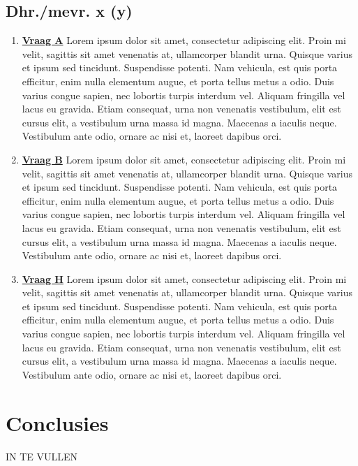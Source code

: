 \documentclass{hogent-article}
\begin{document}
\subsection{Dhr./mevr. x (y)}

\vspace{5pt}

\begin{enumerate}
    \item \textbf{\underline{Vraag A}}\vspace{5pt}\newline
    Lorem ipsum dolor sit amet, consectetur adipiscing elit. Proin mi velit, sagittis sit amet venenatis at, ullamcorper blandit urna. Quisque varius et ipsum sed tincidunt. Suspendisse potenti. Nam vehicula, est quis porta efficitur, enim nulla elementum augue, et porta tellus metus a odio. Duis varius congue sapien, nec lobortis turpis interdum vel. Aliquam fringilla vel lacus eu gravida. Etiam consequat, urna non venenatis vestibulum, elit est cursus elit, a vestibulum urna massa id magna. Maecenas a iaculis neque. Vestibulum ante odio, ornare ac nisi et, laoreet dapibus orci.
  \vspace{5pt}
    \item \textbf{\underline{Vraag B}}\vspace{5pt}\newline
    Lorem ipsum dolor sit amet, consectetur adipiscing elit. Proin mi velit, sagittis sit amet venenatis at, ullamcorper blandit urna. Quisque varius et ipsum sed tincidunt. Suspendisse potenti. Nam vehicula, est quis porta efficitur, enim nulla elementum augue, et porta tellus metus a odio. Duis varius congue sapien, nec lobortis turpis interdum vel. Aliquam fringilla vel lacus eu gravida. Etiam consequat, urna non venenatis vestibulum, elit est cursus elit, a vestibulum urna massa id magna. Maecenas a iaculis neque. Vestibulum ante odio, ornare ac nisi et, laoreet dapibus orci.
  \vspace{5pt}
    \item \textbf{\underline{Vraag H}}\vspace{5pt}\newline
    Lorem ipsum dolor sit amet, consectetur adipiscing elit. Proin mi velit, sagittis sit amet venenatis at, ullamcorper blandit urna. Quisque varius et ipsum sed tincidunt. Suspendisse potenti. Nam vehicula, est quis porta efficitur, enim nulla elementum augue, et porta tellus metus a odio. Duis varius congue sapien, nec lobortis turpis interdum vel. Aliquam fringilla vel lacus eu gravida. Etiam consequat, urna non venenatis vestibulum, elit est cursus elit, a vestibulum urna massa id magna. Maecenas a iaculis neque. Vestibulum ante odio, ornare ac nisi et, laoreet dapibus orci.
\end{enumerate}

\section{Conclusies}

IN TE VULLEN


\printbibliography[heading=bibintoc]
\end{document}
